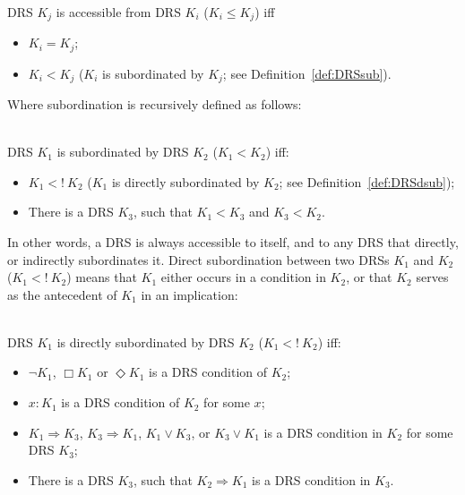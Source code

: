 \begin{definition}~\\
DRS $K_j$ is accessible from DRS $K_i$ ($K_i \leq K_j$) iff
  \begin{itemize}
    \item $K_i = K_j$;
    \item $K_i < K_j$ ($K_i$ is subordinated by $K_j$; 
      see Definition~\ref{def:DRSsub}).
  \end{itemize}
\end{definition}

\noindent Where subordination is recursively defined as follows:

\begin{subdefinition}\label{def:DRSsub}~\\
DRS $K_1$ is subordinated by DRS $K_2$ ($K_1 < K_2$) iff:
  \begin{itemize}
    \item $K_1 <!~K_2$ 
      ($K_1$ is directly subordinated by $K_2$; 
      see Definition~\ref{def:DRSdsub});
    \item There is a DRS $K_3$, such that $K_1 < K_3$  and $K_3 < K_2$.
  \end{itemize}
\end{subdefinition}

\noindent In other words, a DRS is always accessible to itself, and to any
DRS that directly, or indirectly subordinates it.  Direct subordination
between two DRSs $K_1$ and $K_2$ ($K_1 <!~K_2$) means that $K_1$ either
occurs in a condition in $K_2$, or that $K_2$ serves as the antecedent of
$K_1$ in an implication:

\begin{subdefinition}\label{def:DRSdsub}~\\
DRS $K_1$ is directly subordinated by DRS $K_2$ ($K_1 <!~K_2$) iff:
  \begin{itemize}
    \item $\neg K_1$, $\Box K_1$ or $\Diamond K_1$ is a DRS condition of
      $K_2$;
    \item $x:K_1$ is a DRS condition of $K_2$ for some $x$;
    \item $K_1 \Rightarrow K_3$, $K_3 \Rightarrow K_1$, $K_1 \vee K_3$, or 
      $K_3 \vee K_1$ is a DRS condition in $K_2$ for some DRS $K_3$;
    \item There is a DRS $K_3$, such that $K_2 \Rightarrow K_1$
      is a DRS condition in $K_3$.
  \end{itemize}
\end{subdefinition}

